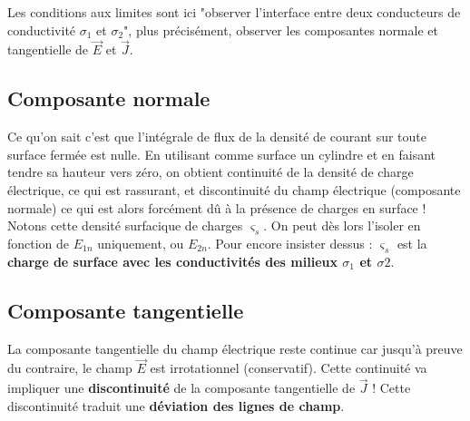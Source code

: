 \documentclass[12pt]{book}
\begin{document}
Les conditions aux limites sont ici "observer l'interface entre deux conducteurs de conductivité $\sigma_1$ et $\sigma_2$", plus précisément, observer les composantes normale et tangentielle de  $\vec{E}$ et $\vec{J}$.

\subsection{Composante normale}
Ce qu'on sait c'est que l'intégrale de flux de la densité de courant sur toute surface fermée est nulle. En utilisant comme surface un cylindre et en faisant tendre sa hauteur vers zéro, on obtient continuité de la densité de charge électrique, ce qui est rassurant, et discontinuité du champ électrique (composante normale) ce qui est alors forcément dû à la présence de charges en surface ! Notons cette densité surfacique de charges $\varsigma_s$. On peut dès lors l'isoler en fonction de $E_{1n}$ uniquement, ou $E_{2n}$. Pour encore insister dessus : $\varsigma_s$ est la \textbf{charge de surface avec les conductivités des milieux $\sigma_1$ et $\sigma2$}.

\subsection{Composante tangentielle}
La composante tangentielle du champ électrique reste continue car jusqu'à preuve du contraire, le champ $\vec{E}$ est irrotationnel (conservatif). Cette continuité va impliquer une \textbf{discontinuité} de la composante tangentielle de $\vec{J}$ ! Cette discontinuité traduit une \textbf{déviation des lignes de champ}.
\end{document}
